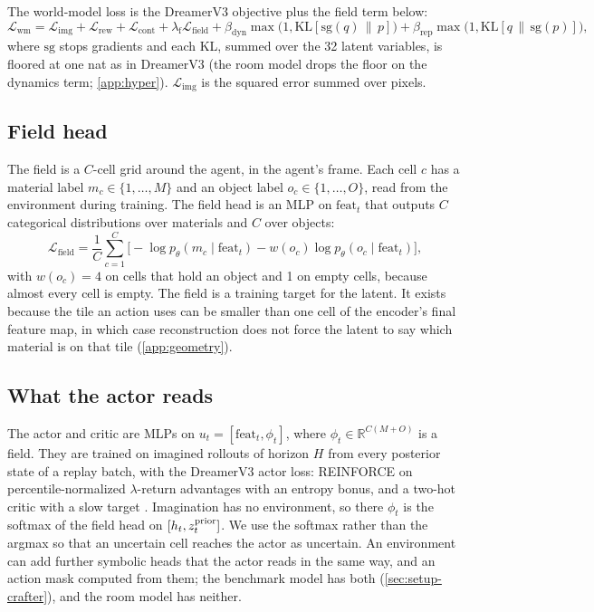 The world-model loss is the DreamerV3 objective plus the field term below:
\begin{equation}
  \mathcal{L}_{\mathrm{wm}} = \mathcal{L}_{\mathrm{img}} + \mathcal{L}_{\mathrm{rew}} + \mathcal{L}_{\mathrm{cont}} + \lambda_{\mathrm{f}}\mathcal{L}_{\mathrm{field}}
  + \beta_{\mathrm{dyn}}\max\!\big(1, \mathrm{KL}[\mathrm{sg}(q)\,\|\,p]\big) + \beta_{\mathrm{rep}}\max\!\big(1, \mathrm{KL}[q\,\|\,\mathrm{sg}(p)]\big),
\end{equation}
where $\mathrm{sg}$ stops gradients and each KL, summed over the 32 latent variables, is floored at one nat as in DreamerV3 (the room model drops the floor on the dynamics term; \cref{app:hyper}).
$\mathcal{L}_{\mathrm{img}}$ is the squared error summed over pixels.

\subsection{Field head}
\label{sec:method-field}

The field is a $C$-cell grid around the agent, in the agent's frame.
Each cell $c$ has a material label $m_c \in \{1,\dots,M\}$ and an object label $o_c \in \{1,\dots,O\}$, read from the environment during training.
The field head is an MLP on $\mathrm{feat}_t$ that outputs $C$ categorical distributions over materials and $C$ over objects:
\begin{equation}
  \mathcal{L}_{\mathrm{field}} = \frac{1}{C}\sum_{c=1}^{C} \Big[ -\log p_\theta(m_c \mid \mathrm{feat}_t) - w(o_c) \log p_\theta(o_c \mid \mathrm{feat}_t) \Big],
\end{equation}
with $w(o_c)=4$ on cells that hold an object and 1 on empty cells, because almost every cell is empty.
The field is a training target for the latent.
It exists because the tile an action uses can be smaller than one cell of the encoder's final feature map, in which case reconstruction does not force the latent to say which material is on that tile (\cref{app:geometry}).

\subsection{What the actor reads}
\label{sec:method-actor}

The actor and critic are MLPs on $u_t = [\mathrm{feat}_t, \phi_t]$, where $\phi_t \in \mathbb{R}^{C(M+O)}$ is a field.
They are trained on imagined rollouts of horizon $H$ from every posterior state of a replay batch, with the DreamerV3 actor loss: REINFORCE on percentile-normalized $\lambda$-return advantages with an entropy bonus, and a two-hot critic with a slow target \citep{hafner2023dreamerv3}.
Imagination has no environment, so there $\phi_t$ is the softmax of the field head on $[h_t, z^{\mathrm{prior}}_t]$.
We use the softmax rather than the argmax so that an uncertain cell reaches the actor as uncertain.
An environment can add further symbolic heads that the actor reads in the same way, and an action mask computed from them; the benchmark model has both (\cref{sec:setup-crafter}), and the room model has neither.

